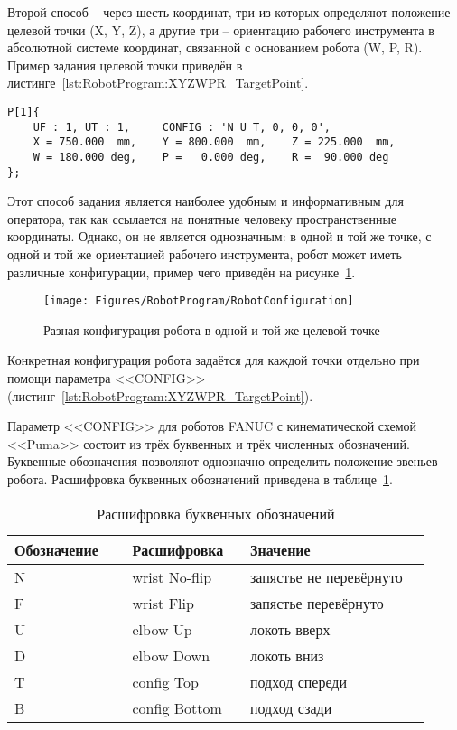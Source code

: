 Второй способ -- через шесть координат, три из которых определяют положение целевой точки (X, Y, Z), а другие три -- ориентацию рабочего инструмента в абсолютной системе координат, связанной с основанием робота (W, P, R).
Пример задания целевой точки приведён в листинге~\ref{lst:RobotProgram:XYZWPR_TargetPoint}.

\begin{lstlisting}[caption={Задание целевой точки с помощью координат XYZWPR}, label={lst:RobotProgram:XYZWPR_TargetPoint}]
P[1]{
    UF : 1, UT : 1,     CONFIG : 'N U T, 0, 0, 0',
    X = 750.000  mm,    Y = 800.000  mm,    Z = 225.000  mm,
    W = 180.000 deg,    P =   0.000 deg,    R =  90.000 deg
};
\end{lstlisting}

Этот способ задания является наиболее удобным и информативным для оператора, так как ссылается на понятные человеку пространственные координаты.
Однако, он не является однозначным: в одной и той же точке, с одной и той же ориентацией рабочего инструмента, робот может иметь различные конфигурации, пример чего приведён на рисунке~\ref{fig:RobotProgram:RobotConfiguration}.

\begin{figure}[H]
    \centering
    \vspace{14pt}
    \texttt{[image: Figures/RobotProgram/RobotConfiguration]}
    \caption{Разная конфигурация робота в одной и той же целевой точке}
    \label{fig:RobotProgram:RobotConfiguration}
\end{figure}

Конкретная конфигурация робота задаётся для каждой точки отдельно при помощи параметра <<CONFIG>> (листинг~\ref{lst:RobotProgram:XYZWPR_TargetPoint}).

Параметр <<CONFIG>> для роботов FANUC с кинематической схемой <<Puma>> состоит из трёх буквенных и трёх численных обозначений.
Буквенные обозначения позволяют однозначно определить положение звеньев робота.
Расшифровка буквенных обозначений приведена в таблице~\ref{tab:RobotProgram:RobotConfig}.

\begin{table}[H]
    \caption{Расшифровка буквенных обозначений}
    \label{tab:RobotProgram:RobotConfig}
    \begin{tabular}{|p{0.26\linewidth}|p{0.26\linewidth}|p{0.4\linewidth}|}
        \hline
        Обозначение & Расшифровка   & Значение                \\ \hline
        N           & wrist No-flip & запястье не перевёрнуто \\ \hline
        F           & wrist Flip    & запястье перевёрнуто    \\ \hline
        U           & elbow Up      & локоть вверх            \\ \hline
        D           & elbow Down    & локоть вниз             \\ \hline
        T           & config Top    & подход спереди          \\ \hline
        B           & config Bottom & подход сзади            \\ \hline
    \end{tabular}
\end{table}

